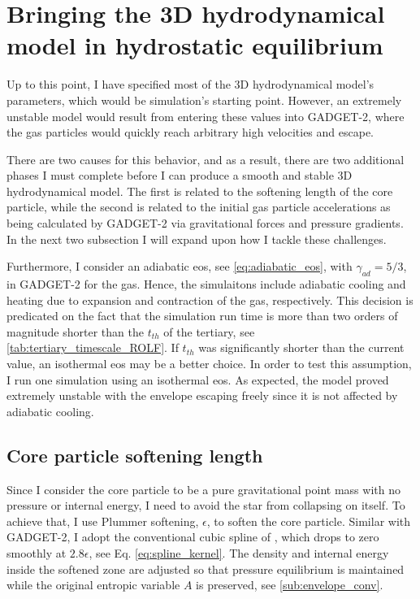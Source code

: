 \section{Bringing the 3D hydrodynamical model in hydrostatic equilibrium}

Up to this point, I have specified most of the 3D hydrodynamical model's parameters, which would be simulation's starting point. However, an extremely unstable model would result from entering these values into GADGET-2, where the gas particles would quickly reach arbitrary high velocities and escape.

There are two causes for this behavior, and as a result, there are two additional phases I must complete before I can produce a smooth and stable 3D hydrodynamical model. The first is related to the softening length of the core particle, while the second is related to the initial gas particle accelerations as being calculated by GADGET-2 via gravitational forces and pressure gradients. In the next two subsection I will expand upon how I tackle these challenges. 

Furthermore, I consider an adiabatic \ac{eos}, see \cref{eq:adiabatic_eos}, with $\gamma_{ad} = 5/3$, in GADGET-2 for the gas. Hence, the simulaitons include adiabatic cooling and heating due to expansion and contraction of the gas, respectively. This decision is predicated on the fact that the simulation run time is more than two orders of magnitude shorter than the $t_{th}$ of the tertiary, see \cref{tab:tertiary_timescale_ROLF}. If $t_{th}$ was significantly shorter than the current value, an isothermal \ac{eos} may be a better choice. In order to test this assumption, I run one simulation using an isothermal \ac{eos}. As expected, the model proved extremely unstable with the envelope escaping freely since it is not affected by adiabatic cooling.

\subsection{Core particle softening length}

Since I consider the core particle to be a pure gravitational point mass with no pressure or internal energy, I need to avoid the star from collapsing on itself.
To achieve that, I use Plummer softening, $\epsilon$, to soften the core particle. Similar with GADGET-2, I adopt the conventional cubic spline of \cite{monaghan1985refined}, which drops to zero smoothly at $2.8 \epsilon$, see Eq. \eqref{eq:spline_kernel}. The density and internal energy inside the softened zone are adjusted so that pressure equilibrium is maintained while the original entropic variable $A$ is preserved, see \cref{sub:envelope_conv}. 


